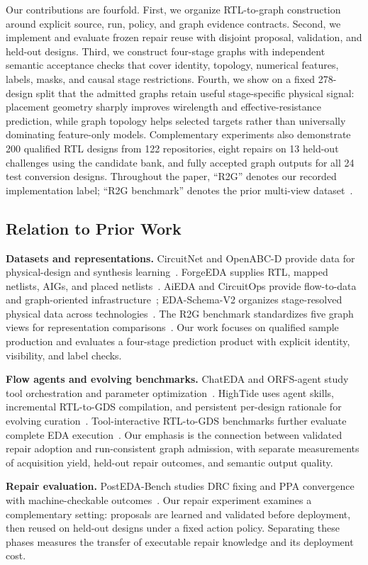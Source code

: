 Our contributions are fourfold. First, we organize RTL-to-graph construction around explicit source, run, policy, and graph evidence contracts. Second, we implement and evaluate frozen repair reuse with disjoint proposal, validation, and held-out designs. Third, we construct four-stage graphs with independent semantic acceptance checks that cover identity, topology, numerical features, labels, masks, and causal stage restrictions. Fourth, we show on a fixed 278-design split that the admitted graphs retain useful stage-specific physical signal: placement geometry sharply improves wirelength and effective-resistance prediction, while graph topology helps selected targets rather than universally dominating feature-only models. Complementary experiments also demonstrate 200 qualified RTL designs from 122 repositories, eight repairs on 13 held-out challenges using the candidate bank, and fully accepted graph outputs for all 24 test conversion designs. Throughout the paper, ``R2G'' denotes our recorded implementation label; ``R2G benchmark'' denotes the prior multi-view dataset~\citep{r2gbenchmark}.

\subsection{Relation to Prior Work}
\textbf{Datasets and representations.} CircuitNet and OpenABC-D provide data for physical-design and synthesis learning~\citep{circuitnet,openabcd}. ForgeEDA supplies RTL, mapped netlists, AIGs, and placed netlists~\citep{forgeeda}. AiEDA and CircuitOps provide flow-to-data and graph-oriented infrastructure~\citep{aieda,circuitops}; EDA-Schema-V2 organizes stage-resolved physical data across technologies~\citep{edaschemav2}. The R2G benchmark standardizes five graph views for representation comparisons~\citep{r2gbenchmark}. Our work focuses on qualified sample production and evaluates a four-stage prediction product with explicit identity, visibility, and label checks.

\textbf{Flow agents and evolving benchmarks.} ChatEDA and ORFS-agent study tool orchestration and parameter optimization~\citep{chateda,orfsagent}. HighTide uses agent skills, incremental RTL-to-GDS compilation, and persistent per-design rationale for evolving curation~\citep{hightide}. Tool-interactive RTL-to-GDS benchmarks further evaluate complete EDA execution~\citep{rtltogdsbench}. Our emphasis is the connection between validated repair adoption and run-consistent graph admission, with separate measurements of acquisition yield, held-out repair outcomes, and semantic output quality.

\textbf{Repair evaluation.} PostEDA-Bench studies DRC fixing and PPA convergence with machine-checkable outcomes~\citep{postedabench}. Our repair experiment examines a complementary setting: proposals are learned and validated before deployment, then reused on held-out designs under a fixed action policy. Separating these phases measures the transfer of executable repair knowledge and its deployment cost.
